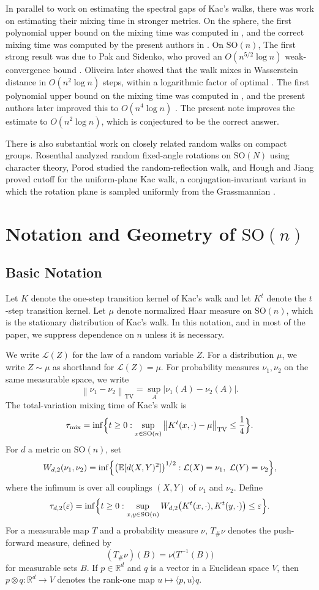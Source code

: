 \documentclass[11pt, reqno]{amsart}
\numberwithin{equation}{section}
\theoremstyle{remark}
\newcommand{\R}{\mathbb{R}}
\newcommand{\E}{\mathbb{E}}
\newcommand{\1}{\mathbf{1}}
\newcommand{\SO}{\mathrm{SO}}
\newcommand{\Law}{\mathcal{L}}
\newcommand{\TV}{\mathrm{TV}}
\newcommand{\mix}{\mathrm{mix}}
\newcommand{\eps}{\varepsilon}
\newcommand{\norm}[1]{\left\lVert #1\right\rVert}
\newcommand{\abs}[1]{\left\lvert #1\right\rvert}
\begin{document}
In parallel to work on estimating the spectral gaps of Kac's walks, there was work on estimating their mixing time in stronger metrics. On the sphere, the first polynomial upper bound on the mixing time was computed in \cite{Jiang2012KacSphere}, and the correct mixing time was computed by the present authors in \cite{PillaiSmith2017KacSphere}. On $\SO(n)$, The first strong result was due to Pak and Sidenko, who proved an $O(n^{5/2}\log n)$ weak-convergence bound \cite{PakSidenko}. Oliveira later showed that the walk mixes in Wasserstein distance in $O(n^2\log n)$ steps, within a logarithmic factor of optimal \cite{Oliveira}. The first polynomial upper bound on the mixing time was computed in \cite{JiangSO}, and the present authors later improved this to $O(n^4\log n)$ \cite{PillaiSmith}. The present note improves the estimate to $O(n^2\log n)$, which is conjectured to be the correct answer.

There is also substantial work on closely related random walks on compact groups. Rosenthal analyzed random fixed-angle rotations on $\SO(N)$ using character theory, Porod studied the random-reflection walk, and Hough and Jiang proved cutoff for the uniform-plane Kac walk, a conjugation-invariant variant in which the rotation plane is sampled uniformly from the Grassmannian \cite{Rosenthal,Porod,HoughJiang}. 

\section{Notation and Geometry of $\SO(n)$}
\label{sec:notation}

\subsection{Basic Notation}
Let $K$ denote the one-step transition kernel of Kac's walk and let $K^{t}$ denote the $t$-step transition kernel. Let $\mu$ denote normalized Haar measure on $\SO(n)$, which is the stationary distribution of Kac's walk. In this notation, and in most of the paper, we suppress dependence on $n$ unless it is necessary.

We  write $\Law(Z)$ for the law of a random variable $Z$. For a distribution $\mu$, we write $Z \sim \mu$ as shorthand for $\Law(Z) = \mu$. For probability measures $\nu_1,\nu_2$ on the same measurable space, we write
\[
\norm{\nu_1-\nu_2}_{\TV}=\sup_A \abs{\nu_1(A)-\nu_2(A)}.
\]
The total-variation mixing time of Kac's walk is
\[
\tau_{\mix}=\inf\Bigl\{t\ge 0: \sup_{x\in \SO(n)} \norm{K^t(x,\cdot)-\mu}_{\TV}\le \frac14\Bigr\}.
\]
For $d$ a metric on $\SO(n)$, set
\[
W_{d,2}(\nu_1,\nu_2)=\inf\Bigl\{\bigl(\E[d(X,Y)^2]\bigr)^{1/2}: \Law(X)=\nu_1,\ \Law(Y)=\nu_2\Bigr\},
\]
where the infimum is over all couplings $(X,Y)$ of $\nu_1$ and $\nu_2$. Define
\[
\tau_{d,2}(\eps)=\inf\Bigl\{t\ge 0: \sup_{x,y\in \SO(n)} W_{d,2}\bigl(K^t(x,\cdot),K^t(y,\cdot)\bigr)\le \eps\Bigr\}.
\]
For a measurable map $T$ and a probability measure $\nu$, $T_\#\nu$ denotes the push-forward measure, defined by
\[
(T_\#\nu)(B)=\nu\bigl(T^{-1}(B)\bigr)
\]
for measurable sets $B$. If $p\in\R^d$ and $q$ is a vector in a Euclidean space $V$, then $p\otimes q:\R^d\to V$ denotes the rank-one map $u\mapsto \langle p,u\rangle q$.
\end{document}
